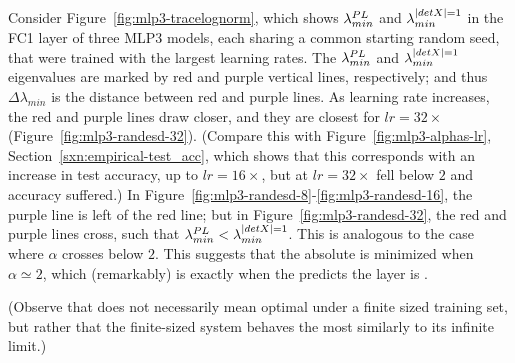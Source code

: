 Consider Figure~\ref{fig:mlp3-tracelognorm}, which shows $\lambda^{PL}_{min}$ and $\lambda^{\vert detX\vert=1}_{min}$ in the FC1 layer of three MLP3 models, each sharing a common starting random seed, that were trained with the largest learning rates.
The $\lambda^{PL}_{min}$ and $\lambda^{\vert detX\vert=1}_{min}$ eigenvalues are marked by red and purple vertical lines, respectively; and thus $\Delta \lambda_{min}$ is the distance between red and purple lines.
%
As learning rate increases, the red and purple lines draw closer, and they are closest for $lr=32\times$ (Figure~\ref{fig:mlp3-randesd-32}). 
(Compare this with Figure~\ref{fig:mlp3-alphas-lr}, Section~\ref{sxn:empirical-test_acc}, which shows that this corresponds with an increase in test accuracy, up to $lr=16\times$, but at $lr=32\times$ \ALPHA fell below $2$ and accuracy suffered.) 
In Figure~\ref{fig:mlp3-randesd-8}-\ref{fig:mlp3-randesd-16}, the purple line is left of the red line; but in Figure~\ref{fig:mlp3-randesd-32}, the red and purple lines cross, such that $\lambda^{PL}_{min} < \lambda^{\vert detX\vert=1}_{min}$.
This is analogous to the case where $\alpha$ crosses below $2$. 
This suggests that the absolute \TRACELOG  is minimized when $\alpha\simeq2$, which (remarkably) is exactly when the \HTSR \Phenomenology predicts the layer is \Ideal.

(Observe that \Ideal does not necessarily mean optimal under a finite sized training set, but rather that the finite-sized system behaves the most similarly to its infinite limit.)

